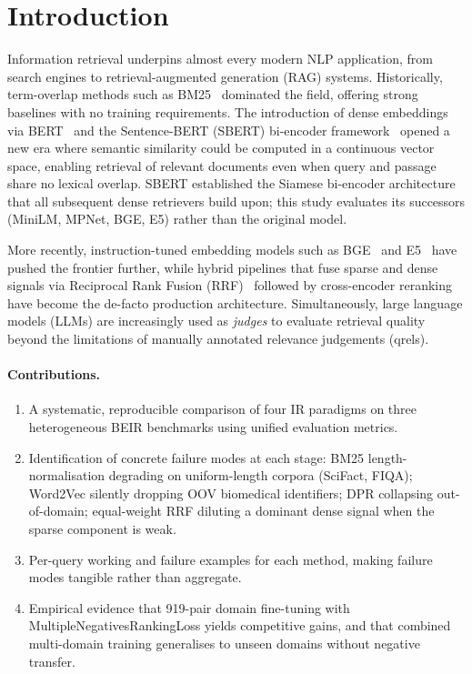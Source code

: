 \documentclass[12pt, a4paper]{article}
\newcommand{\fiqa}{FIQA}
\newcommand{\scifact}{SciFact}
\begin{document}
\section{Introduction}
\label{sec:intro}

Information retrieval underpins almost every modern NLP application, from
search engines to retrieval-augmented generation (RAG) systems.  Historically,
term-overlap methods such as BM25~\citep{robertson2009probabilistic} dominated
the field, offering strong baselines with no training requirements.  The
introduction of dense embeddings via BERT~\citep{devlin2019bert} and the
Sentence-BERT (SBERT) bi-encoder framework~\citep{reimers2019sentence} opened
a new era where semantic similarity could be computed in a continuous vector
space, enabling retrieval of relevant documents even when query and passage
share no lexical overlap.  SBERT established the Siamese bi-encoder
architecture that all subsequent dense retrievers build upon; this study
evaluates its successors (MiniLM, MPNet, BGE, E5) rather than the
original model.

More recently, instruction-tuned embedding models such as
BGE~\citep{xiao2023c} and E5~\citep{wang2022text} have pushed the frontier
further, while hybrid pipelines that fuse sparse and dense signals via
Reciprocal Rank Fusion (RRF)~\citep{cormack2009reciprocal} followed by
cross-encoder reranking have become the de-facto production architecture.
Simultaneously, large language models (LLMs) are increasingly used as
\emph{judges} to evaluate retrieval quality beyond the limitations of
manually annotated relevance judgements (qrels).

\paragraph{Contributions.}
\begin{enumerate}
  \item A systematic, reproducible comparison of four IR paradigms on three
        heterogeneous BEIR benchmarks using unified evaluation metrics.
  \item Identification of concrete failure modes at each stage: BM25
        length-normalisation degrading on uniform-length corpora (\scifact{},
        \fiqa{}); Word2Vec silently dropping OOV biomedical identifiers;
        DPR collapsing out-of-domain; equal-weight RRF diluting a dominant
        dense signal when the sparse component is weak.
  \item Per-query working and failure examples for each method, making
        failure modes tangible rather than aggregate.
  \item Empirical evidence that 919-pair domain fine-tuning with
        MultipleNegativesRankingLoss yields competitive gains, and that
        combined multi-domain training generalises to unseen domains
        without negative transfer.
\end{enumerate}
\end{document}
